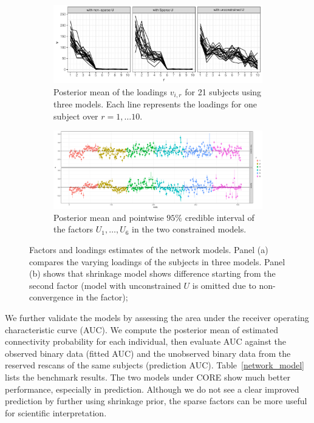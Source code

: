 \documentclass[10pt,fleqn]{article}
\DeclareMathOperator{\1}{\mathbbm{1}} \DeclareMathOperator{\bigO}{\mc O}
\begin{document}
\begin{figure}[h] \centering
\begin{subfigure}[b]{0.8\textwidth}
\includegraphics[width=1\textwidth]{network_loading}
\caption{Posterior mean of the loadings $v_{i,r}$ for 21 subjects
using three models. Each line represents the loadings for one
subject over $r=1,\ldots10$.} \end{subfigure}
\begin{subfigure}[b]{1\textwidth}
\includegraphics[width=1\textwidth]{network_factor.pdf}
\caption{Posterior mean and pointwise $95\%$ credible interval of
the factors $U_1,\ldots, U_6$ in the two constrained
models. } \end{subfigure}
\caption{Factors and loadings estimates
of the network models. 
Panel (a) compares the varying loadings of
the subjects in three models.
Panel (b) shows that shrinkage model shows difference
starting from the second factor
(model with unconstrained $U$ is
omitted due to non-convergence in the factor);
\label{network_model_basis}} \end{figure}


We further validate the models by assessing the area under the receiver
operating characteristic curve (AUC). We compute the posterior mean of estimated
connectivity probability for each individual, then evaluate AUC against the
observed binary data (fitted AUC) and the unobserved binary data from the
reserved rescans of the same subjects (prediction AUC).
Table~\ref{network_model} lists the benchmark results. The two models under CORE
show much better performance, especially in prediction. Although we do not see a
clear improved prediction by further using shrinkage prior, the sparse factors
can be more useful for scientific interpretation.
\end{document}
